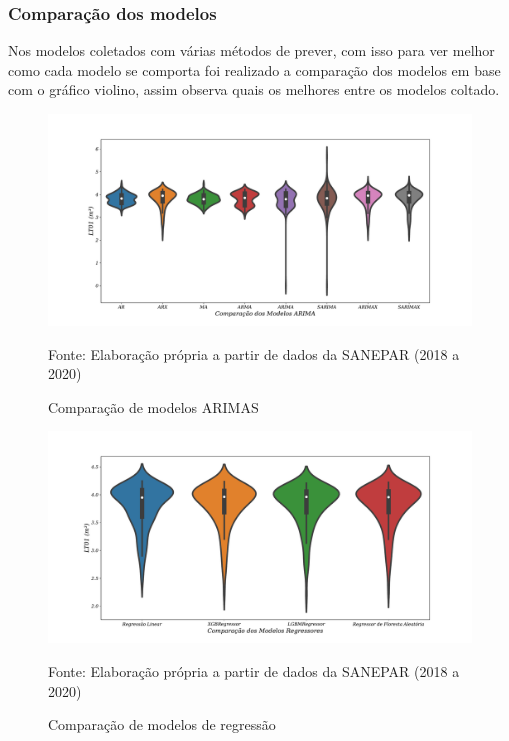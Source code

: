 \subsubsection{Compara\c c\~ao dos modelos}
 Nos modelos coletados com várias métodos de prever, com isso para ver melhor como cada modelo se comporta foi realizado a comparação dos modelos em base com o gráfico violino, assim observa quais os melhores entre os modelos coltado.
 
 \begin{figure}[H]
 	\centering
 	\caption{Comparação de modelos ARIMAS}
 	\includegraphics[width=0.9\linewidth]{Resultados/Figuras/modelos-arima}
 	
 	\label{fig:modelos-arima}
 	
 	Fonte: Elaboração própria a partir de dados da SANEPAR (2018 a 2020)
 \end{figure}
 
 
 \begin{figure}[H]
 	\centering
 	\caption{Comparação de modelos de regressão }
 	\includegraphics[width=0.9\linewidth]{Resultados/Figuras/violin-LR-XGB-LGBM-RF}
 	
 	\label{fig:violin-lr-xgb-lgbm-rf}
 	
 	Fonte: Elaboração própria a partir de dados da SANEPAR (2018 a 2020)
 \end{figure}



